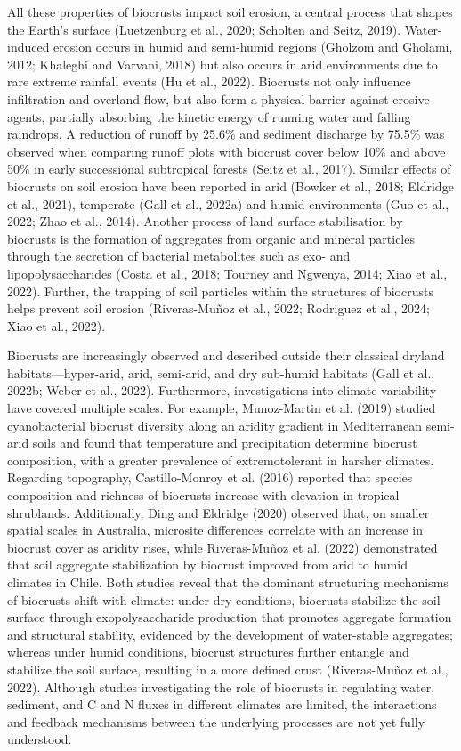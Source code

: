 All these properties of biocrusts impact soil erosion, a central process that shapes the Earth’s surface (Luetzenburg et al., 2020; Scholten and Seitz, 2019). Water-induced erosion occurs in humid and semi-humid regions (Gholzom and Gholami, 2012; Khaleghi and Varvani, 2018) but also occurs in arid environments due to rare extreme rainfall events (Hu et al., 2022). Biocrusts not only influence infiltration and overland flow, but also form a physical barrier against erosive agents, partially absorbing the kinetic energy of running water and falling raindrops. A reduction of runoff by 25.6\% and sediment discharge by 75.5\% was observed when comparing runoff plots with biocrust cover below 10\% and above 50\% in early successional subtropical forests (Seitz et al., 2017). Similar effects of biocrusts on soil erosion have been reported in arid (Bowker et al., 2018; Eldridge et al., 2021), temperate (Gall et al., 2022a) and humid environments (Guo et al., 2022; Zhao et al., 2014). Another process of land surface stabilisation by biocrusts is the formation of aggregates from organic and mineral particles through the secretion of bacterial metabolites such as exo- and lipopolysaccharides (Costa et al., 2018; Tourney and Ngwenya, 2014; Xiao et al., 2022). Further, the trapping of soil particles within the structures of biocrusts helps prevent soil erosion (Riveras-Muñoz et al., 2022; Rodriguez et al., 2024; Xiao et al., 2022).

Biocrusts are increasingly observed and described outside their classical dryland habitats—hyper-arid, arid, semi-arid, and dry sub-humid habitats (Gall et al., 2022b; Weber et al., 2022). Furthermore, investigations into climate variability have covered multiple scales. For example, Munoz-Martin et al. (2019) studied cyanobacterial biocrust diversity along an aridity gradient in Mediterranean semi-arid soils and found that temperature and precipitation determine biocrust composition, with a greater prevalence of extremotolerant in harsher climates. Regarding topography, Castillo-Monroy et al. (2016) reported that species composition and richness of biocrusts increase with elevation in tropical shrublands. Additionally, Ding and Eldridge (2020) observed that, on smaller spatial scales in Australia, microsite differences correlate with an increase in biocrust cover as aridity rises, while Riveras-Muñoz et al. (2022) demonstrated that soil aggregate stabilization by biocrust improved from arid to humid climates in Chile. Both studies reveal that the dominant structuring mechanisms of biocrusts shift with climate: under dry conditions, biocrusts stabilize the soil surface through exopolysaccharide production that promotes aggregate formation and structural stability, evidenced by the development of water-stable aggregates; whereas under humid conditions, biocrust structures further entangle and stabilize the soil surface, resulting in a more defined crust (Riveras-Muñoz et al., 2022). Although studies investigating the role of biocrusts in regulating water, sediment, and C and N fluxes in different climates are limited, the interactions and feedback mechanisms between the underlying processes are not yet fully understood.

